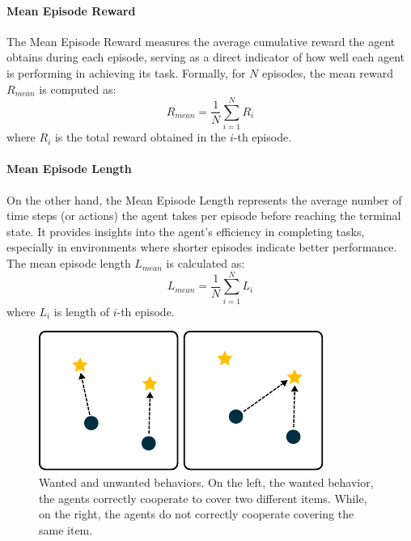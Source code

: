 \documentclass[sigconf]{acmart}
\begin{document}
\paragraph{Mean Episode Reward} 
The Mean Episode Reward measures the average cumulative reward the agent obtains during each episode, 
  serving as a direct indicator of how well each agent is performing in achieving its task.
%
Formally, for $N$ episodes, the mean reward $R_{mean}$ is computed as:
  \[ R_{mean} = \frac{1}{N} \sum_{i=1}^{N} R_i \]
  where $R_i$ is the total reward obtained in the $i$-th episode.

\paragraph{Mean Episode Length}
On the other hand, the Mean Episode Length represents the average number of time steps (or actions) 
  the agent takes per episode before reaching the terminal state. 
%
It provides insights into the agent's efficiency in completing tasks, especially in environments 
  where shorter episodes indicate better performance.
%
The mean episode length $L_{mean}$ is calculated as:
  \[ L_{mean} = \frac{1}{N} \sum_{i=1}^{N} L_i \]
  where $L_i$ is length of $i$-th episode.



\begin{figure}
  \centering
  \includegraphics[width=1\linewidth]{figures/behavior.pdf}
  \caption{Wanted and unwanted behaviors.
  On the left, the wanted behavior, the agents correctly cooperate to cover
  two different items.
  While, on the right, the agents do not correctly cooperate covering
  the same item.
  }
  \label{fig:behavior}
\end{figure}
\end{document}

